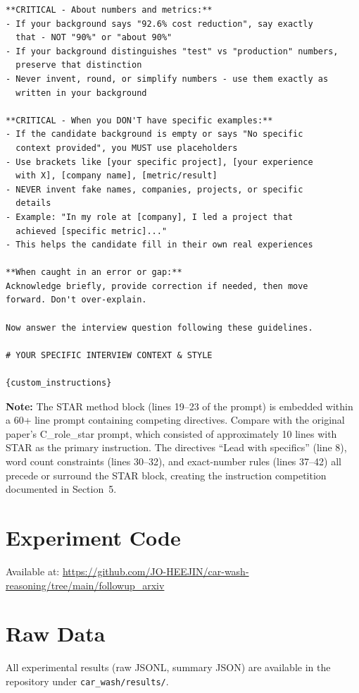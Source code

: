 \documentclass[11pt]{article}
\begin{document}
\begin{lstlisting}
**CRITICAL - About numbers and metrics:**
- If your background says "92.6% cost reduction", say exactly
  that - NOT "90%" or "about 90%"
- If your background distinguishes "test" vs "production" numbers,
  preserve that distinction
- Never invent, round, or simplify numbers - use them exactly as
  written in your background

**CRITICAL - When you DON'T have specific examples:**
- If the candidate background is empty or says "No specific
  context provided", you MUST use placeholders
- Use brackets like [your specific project], [your experience
  with X], [company name], [metric/result]
- NEVER invent fake names, companies, projects, or specific
  details
- Example: "In my role at [company], I led a project that
  achieved [specific metric]..."
- This helps the candidate fill in their own real experiences

**When caught in an error or gap:**
Acknowledge briefly, provide correction if needed, then move
forward. Don't over-explain.

Now answer the interview question following these guidelines.

# YOUR SPECIFIC INTERVIEW CONTEXT & STYLE

{custom_instructions}
\end{lstlisting}

\textbf{Note:} The STAR method block (lines 19--23 of the prompt) is embedded within a 60+ line prompt containing competing directives. Compare with the original paper's C\_role\_star prompt, which consisted of approximately 10 lines with STAR as the primary instruction. The directives ``Lead with specifics'' (line 8), word count constraints (lines 30--32), and exact-number rules (lines 37--42) all precede or surround the STAR block, creating the instruction competition documented in Section~5.

\section{Experiment Code}

Available at: \url{https://github.com/JO-HEEJIN/car-wash-reasoning/tree/main/followup_arxiv}

\section{Raw Data}

\begin{sloppypar}
All experimental results (raw JSONL, summary JSON) are available in the repository under
\texttt{car\_wash/\allowbreak{}results/}.
\end{sloppypar}
\end{document}
